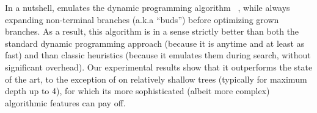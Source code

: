 \documentclass{article}
\begin{document}
In a nutshell, \budalg emulates the dynamic programming algorithm \dleight~\cite{dl8}, while always expanding non-terminal branches (a.k.a ``buds'') before optimizing grown branches. As a result, this algorithm is in a sense strictly better than both the standard dynamic programming approach (because it is anytime and at least as fast) and than classic heuristics (because it emulates them during search, without significant overhead).
Our experimental results show that it outperforms the state of the art, to the exception of \murtree on relatively shallow trees (typically for maximum depth up to 4), for which its more sophisticated (albeit more complex) algorithmic features can pay off.
\end{document}

